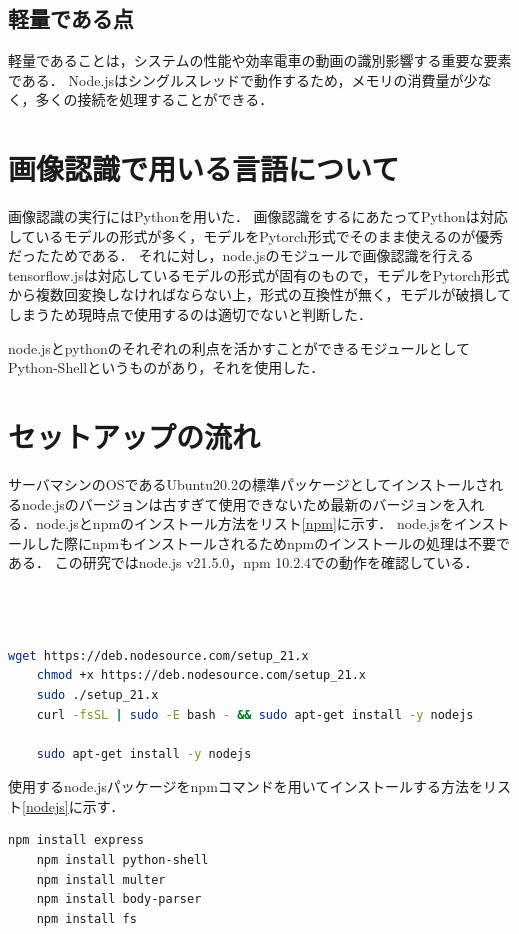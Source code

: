 \subsection{軽量である点}

軽量であることは，システムの性能や効率電車の動画の識別影響する重要な要素である．
Node.jsはシングルスレッドで動作するため，メモリの消費量が少なく，多くの接続を処理することができる．

\section{画像認識で用いる言語について}
画像認識の実行にはPythonを用いた．
画像認識をするにあたってPythonは対応しているモデルの形式が多く，モデルをPytorch形式でそのまま使えるのが優秀だったためである．
それに対し，node.jsのモジュールで画像認識を行えるtensorflow.jsは対応しているモデルの形式が固有のもので，モデルをPytorch形式から複数回変換しなければならない上，形式の互換性が無く，モデルが破損してしまうため現時点で使用するのは適切でないと判断した．

node.jsとpythonのそれぞれの利点を活かすことができるモジュールとしてPython-Shellというものがあり，それを使用した．~\cite{shell}

\section{セットアップの流れ}
サーバマシンのOSであるUbuntu20.2の標準パッケージとしてインストールされるnode.jsのバージョンは古すぎて使用できないため最新のバージョンを入れる．node.jsとnpmのインストール方法をリスト\ref{npm}に示す．
node.jsをインストールした際にnpmもインストールされるためnpmのインストールの処理は不要である．
この研究ではnode.js v21.5.0，npm 10.2.4での動作を確認している．\\
\\
\\
\\
\begin{lstlisting}[language=Bash, caption=node.js，npmのインストール,label=npm]
	wget https://deb.nodesource.com/setup_21.x
	chmod +x https://deb.nodesource.com/setup_21.x
	sudo ./setup_21.x
	curl -fsSL | sudo -E bash - && sudo apt-get install -y nodejs
	
	sudo apt-get install -y nodejs
\end{lstlisting}
使用するnode.jsパッケージをnpmコマンドを用いてインストールする方法をリスト\ref{nodejs}に示す．
\begin{lstlisting}[language=Bash, caption=使用するnode.jsのモジュールのインストール,label=nodejs]
	npm install express
	npm install python-shell
	npm install multer
	npm install body-parser
	npm install fs
\end{lstlisting}

